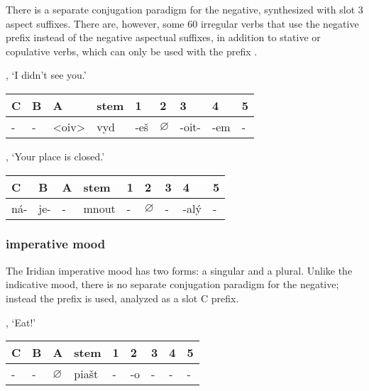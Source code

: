 \xe

\par There is a separate conjugation paradigm for the negative, synthesized with slot 3 aspect suffixes. There are, however, some 60 irregular verbs that use the negative prefix  instead of the negative aspectual suffixes, in addition to stative or copulative verbs, which can only be used with the prefix .

\pex 
\a {}, `I didn't see you.'
\begin{center}
	\small
	\begin{tabu}to \textwidth{MMMM[1.5]MMMMM}
		\toprule
		C&B&A&{\sc stem}&1&2&3&4&5\\
		\midrule
		\addlinespace
		-&-&<oiv>&vyd&-e\v{s}&$\varnothing$&-oit-&-em&-\\
		\bottomrule
	\end{tabu}
\end{center}

\a {}, `Your place is closed.'
\begin{center}
	\small
	\begin{tabu}to \textwidth{MMMM[1.5]MMMMM}
		\toprule
		C&B&A&{\sc stem}&1&2&3&4&5\\
		\midrule
		\addlinespace
		ná-&je-&-&mnout&-&$\varnothing$&-&-alý&-\\
		\bottomrule
	\end{tabu}
\end{center}

\xe

\subsubsection{imperative mood}

\par The Iridian imperative mood has two forms: a singular and a plural. Unlike the indicative mood, there is no separate conjugation paradigm for the negative; instead the prefix  is used, analyzed as a slot C prefix.

\pex 
\a {}, `Eat!'
\begin{center}
	\small
	\begin{tabu}to \textwidth{MMMM[1.5]MMMMM}
		\toprule
		C&B&A&{\sc stem}&1&2&3&4&5\\
		\midrule
		\addlinespace
		-&-&$\varnothing$&pia\v{s}t&-&-o&-&-&-\\
		\bottomrule
	\end{tabu}
\end{center}

